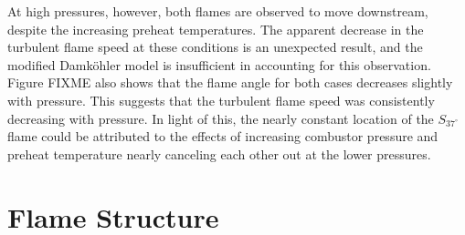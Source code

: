 At high pressures, however, both flames are observed to move downstream, despite the increasing preheat temperatures.
The apparent decrease in the turbulent flame speed at these conditions is an unexpected result, and the modified Damk\"ohler model is insufficient in accounting for this observation.
Figure FIXME also shows that the flame angle for both cases decreases slightly with pressure.
This suggests that the turbulent flame speed was consistently decreasing with pressure.
In light of this, the nearly constant location of the \(S_{37^\circ}\) flame could be attributed to the effects of increasing combustor pressure and preheat temperature nearly canceling each other out at the lower pressures.



\section{Flame Structure}
\label{sec:lsb-flame-structure}

